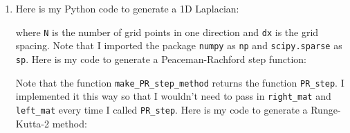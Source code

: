 \documentclass{article} %
\theoremstyle{plain}
\numberwithin{equation}{section} %
\numberwithin{figure}{section} %
\numberwithin{table}{section} %
\begin{document}
\begin{enumerate}[\ \ (a)]
    \item
        Here is my Python code to generate a 1D Laplacian:
        
        where \verb|N| is the number of grid points in one direction and \verb|dx| is the grid spacing.  Note that I imported the package \verb|numpy| as \verb|np| and \verb|scipy.sparse| as \verb|sp|.  Here is my code to generate a Peaceman-Rachford step function:
        
        Note that the function \verb|make_PR_step_method| returns the function \verb|PR_step|.  I implemented it this way so that I wouldn't need to pass in \verb|right_mat| and \verb|left_mat| every time I called \verb|PR_step|.  Here is my code to generate a Runge-Kutta-2 method:
        

\end{enumerate}
\end{document}
